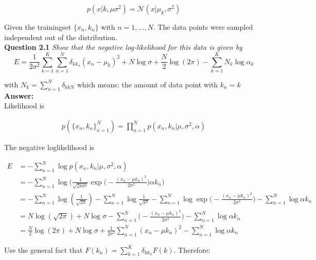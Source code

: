 \documentclass[a4paper]{article}
\begin{document}
\begin{equation}
	p(x | k, \mu \sigma^2) = \mathcal{N}(x | \mu_k, \sigma^2)
\end{equation}

Given the trainingset $\{ x_n, k_n\}$ with $n = 1, ..., N$. The data points were sampled independent out of the distribution.\\

\textbf{Question 2.1}  \textit{Show that the negative log-likelihood for this data is given by}\\



\begin{equation}
	E = \frac{1}{2 \sigma^2} \sum_{k=1}^K \sum_{n=1}^N \delta_{kk_n}(x_n - \mu_k)^2 + N \log \sigma + \frac{N}{2} \log(2 \pi) - \sum_{k=1}^K N_k \log \alpha_k
\end{equation}

with $N_k = \sum_{n = 1}^N \delta_{kkN}$ which means: the amount of data point with $k_n = k$\\ 

\textbf{Answer:}\\

Likelihood is

\begin{align*}
p(\{ x_n, k_n \}_{n=1}^N) = \prod_{n=1}^N p(x_n, k_n | \mu, \sigma^2, \alpha)
\end{align*}

The negative loglikelihood is

\begin{align*}
E &= - \sum_{n=1}^N \log p(x_n, k_n | \mu, \sigma^2, \alpha)\\
&= - \sum_{n=1}^N \log \Big( \frac{1}{\sqrt{2 \pi \sigma^2}} \exp \Big( - \frac{(x_n - \mu k_n)^2}{2 \sigma^2} \Big) \alpha k_n \Big)\\
&= - \sum_{n=1}^N \log(\frac{1}{\sqrt{2 \pi}}) - \sum_{n=1}^N \log \frac{1}{\sqrt{\sigma^2}} - \sum_{n=1}^N \log \exp \Big( - \frac{ (x_n - \mu k_n)^2}{2 \sigma^2} \Big) - \sum_{n=1}^N \log \alpha k_n\\
&= N \log(\sqrt{2 \pi}) + N \log \sigma - \sum_{n=1}^N \Big( - \frac{ (x_n - \mu k_n)^2}{2 \sigma^2} \Big) - \sum_{n=1}^N \log \alpha k_n\\
&= \frac{N}{2} \log(2 \pi) + N \log \sigma + \frac{1}{2 \sigma^2} \sum_{n=1}^N (x_n - \mu k_n)^2 - \sum_{n=1}^N \log \alpha k_n
\end{align*}

Use the general fact that $F(k_n) = \sum_{k=1}^K \delta_{kk_n} F(k)$. Therefore:
\end{document}

